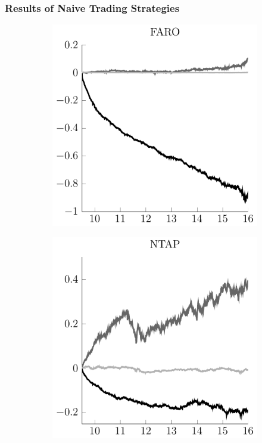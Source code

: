 \begin{frame}
\frametitle{Results of Naive Trading Strategies}
\begin{figure}%
\centering%
\begin{subfigure}[b]{.4\linewidth}%
  \includegraphics[scale=1]{frames/figs/FARO_naive_strat_comp.pdf}%
\end{subfigure}%
\hspace{1.5cm}%
\begin{subfigure}[b]{.4\linewidth}%
  \includegraphics[scale=1]{frames/figs/NTAP_naive_strat_comp.pdf}%

\end{subfigure}
\end{figure}
\end{frame}
